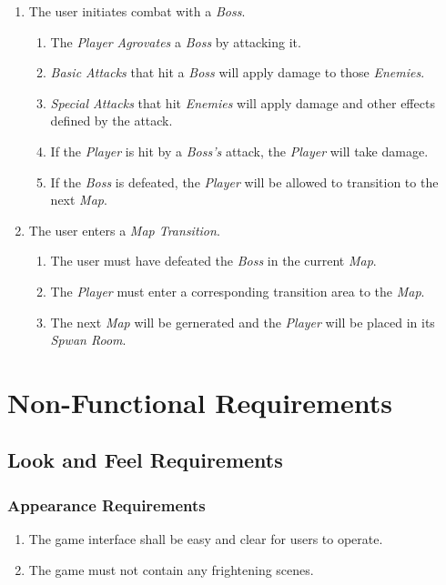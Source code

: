 \documentclass[12pt, titlepage]{article}
\begin{document}
\begin{enumerate}[{VP}1.]
\begin{enumerate}[{BE1}.1]
    \item The user initiates combat with a \textit{Boss}.
    \begin{enumerate}
      \item The \textit{Player} \textit{Agrovates} a \textit{Boss} by attacking it.
      \item \textit{Basic Attacks} that hit a \textit{Boss} will apply damage to those \textit{Enemies}.
      \item \textit{Special Attacks} that hit \textit{Enemies} will apply damage and other effects defined by the attack.
      \item If the \textit{Player} is hit by a \textit{Boss's} attack, the \textit{Player} will take damage.
      \item If the \textit{Boss} is defeated, the \textit{Player} will be allowed to transition to the next \textit{Map}.
    \end{enumerate}

    \item The user enters a \textit{Map Transition}.
    \begin{enumerate}
      \item The user must have defeated the \textit{Boss} in the current \textit{Map}.
      \item The \textit{Player} must enter a corresponding transition area to the \textit{Map}.
      \item The next \textit{Map} will be gernerated and the \textit{Player} will be placed in its \textit{Spwan Room}.
    \end{enumerate}

  \end{enumerate}
\end{enumerate}

\section{Non-Functional Requirements}
\label{sec:non-functional_requirements}
\subsection{Look and Feel Requirements}
\label{sub:look_and_feel_requirements}

\subsubsection{Appearance Requirements}
\label{ssub:appearance_requirements}
\begin{enumerate}[{LF}1. ]
        \item The game interface shall be easy and clear for users to operate.
        \item The game must not contain any frightening scenes.
\end{enumerate}
\end{document}
